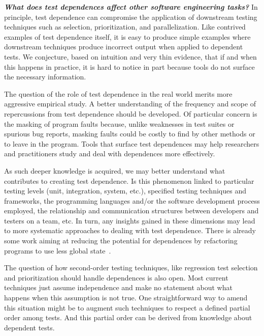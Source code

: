 \vspace{1mm}

\noindent \textbf{\textit{What does 
test dependences affect other software engineering tasks?}}
In principle, test dependence can compromise
the application of downstream testing techniques such as selection,
prioritization, and parallelization.  Like contrived examples of test
dependence itself, it is easy to produce simple examples where
downstream techniques produce incorrect output when applied to dependent
tests.
We conjecture, based on intuition and
very thin evidence, that if and when this happens in practice, it is
hard to notice in part because tools do not surface the necessary
information.

The question of the role of test dependence in the real world merits
more aggressive empirical study.  A better understanding of the 
frequency and scope of repercussions from test dependence should be
developed.  Of particular concern is the
masking of program faults because, unlike weaknesses
in test suites or spurious bug reports, masking
faults could be costly to find by other methods or to leave in the program.
Tools that surface test dependences may help researchers
and practitioners study and deal with dependences more effectively.

As such deeper knowledge is acquired, we may better understand
what contributes to creating test dependence. Is this
  phenomenon linked to particular testing levels (unit, integration,
  system, etc.), specified testing techniques and frameworks, the programming
languages and/or the software development process employed, the relationship
and communication structures between developers and testers on a team, etc.  In turn,
any insights gained in these dimensions may lead to more systematic
approaches to dealing with test dependence.
There is already some work aiming at
reducing the potential for dependences by refactoring programs to use
less global state~\cite{wlokaetal:FSE:2009}. 

The question of how second-order testing techniques, like regression test
selection and prioritization should handle dependences is also open.
Most current techniques just assume independence and make no statement
about what happens when this assumption is not true. One
straightforward way to amend this situation might be to augment such
techniques to respect a defined partial order among tests. And this partial order
can be derived from knowledge about dependent tests.


